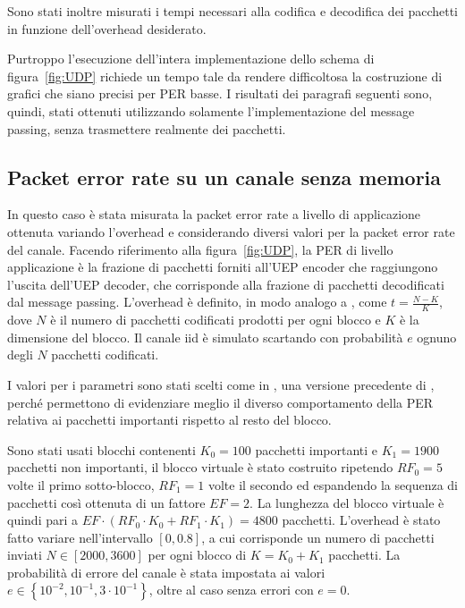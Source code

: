 \documentclass[italian, a4paper, 12pt]{article}
\begin{document}
Sono stati inoltre misurati i tempi necessari alla codifica e
decodifica dei pacchetti in funzione dell'overhead desiderato.

Purtroppo l'esecuzione dell'intera implementazione dello schema di
figura~\ref{fig:UDP} richiede un tempo tale da rendere difficoltosa la
costruzione di grafici che siano precisi per PER basse.
%
I risultati dei paragrafi seguenti sono, quindi, stati ottenuti
utilizzando solamente l'implementazione del message passing, senza
trasmettere realmente dei pacchetti.

\subsection{Packet error rate su un canale senza memoria}
\label{sec:iid}
In questo caso è stata misurata la packet error rate a livello di
applicazione ottenuta variando l'overhead e considerando diversi
valori per la packet error rate del canale.
%
Facendo riferimento alla figura~\ref{fig:UDP}, la PER di livello
applicazione è la frazione di pacchetti forniti all'UEP encoder che
raggiungono l'uscita dell'UEP decoder, che corrisponde alla frazione
di pacchetti decodificati dal message passing.
%
L'overhead è definito, in modo analogo a \cite{uep}, come $t =
\frac{N-K}{K}$, dove $N$ è il numero di pacchetti codificati prodotti
per ogni blocco e $K$ è la dimensione del blocco.
%
Il canale iid è simulato scartando con probabilità $e$ ognuno degli
$N$ pacchetti codificati.

I valori per i parametri sono stati scelti come in \cite{uepother},
una versione precedente di \cite{uep}, perché permettono di
evidenziare meglio il diverso comportamento della PER relativa ai
pacchetti importanti rispetto al resto del blocco.

Sono stati usati blocchi contenenti $K_0 = 100$ pacchetti importanti e
$K_1 = 1900$ pacchetti non importanti, il blocco virtuale è stato
costruito ripetendo $RF_0 = 5$ volte il primo sotto-blocco, $RF_1 = 1$
volte il secondo ed espandendo la sequenza di pacchetti così ottenuta
di un fattore $EF = 2$. La lunghezza del blocco virtuale è quindi pari
a $EF \cdot \left( RF_0 \cdot K_0 + RF_1 \cdot K_1 \right) = 4800$
pacchetti.
%
L'overhead è stato fatto variare nell'intervallo $[0, 0.8]$, a cui
corrisponde un numero di pacchetti inviati $N \in [2000, 3600]$ per
ogni blocco di $K=K_0+K_1$ pacchetti.
%
La probabilità di errore del canale è stata impostata ai valori $e \in
\left\{10^{-2}, 10^{-1}, 3 \cdot 10^{-1} \right\}$, oltre al caso
senza errori con $e=0$.
\end{document}
